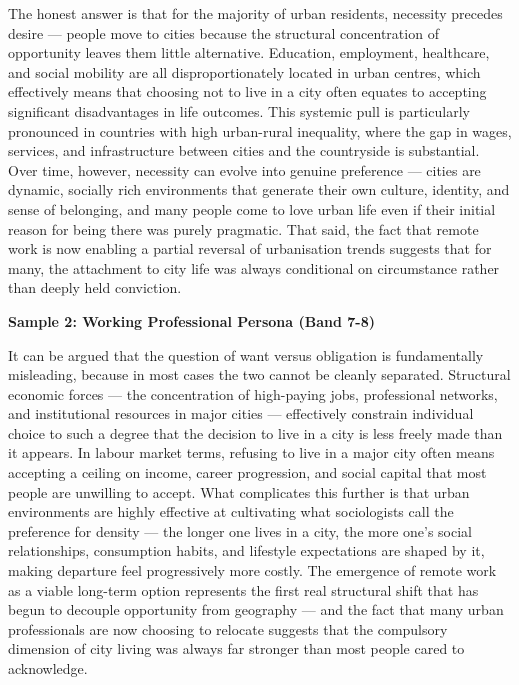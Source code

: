 The honest answer is that for the majority of urban residents, necessity precedes desire — people move to cities because the structural concentration of opportunity leaves them little alternative. Education, employment, healthcare, and social mobility are all disproportionately located in urban centres, which effectively means that choosing not to live in a city often equates to accepting significant disadvantages in life outcomes. This systemic pull is particularly pronounced in countries with high urban-rural inequality, where the gap in wages, services, and infrastructure between cities and the countryside is substantial. Over time, however, necessity can evolve into genuine preference — cities are dynamic, socially rich environments that generate their own culture, identity, and sense of belonging, and many people come to love urban life even if their initial reason for being there was purely pragmatic. That said, the fact that remote work is now enabling a partial reversal of urbanisation trends suggests that for many, the attachment to city life was always conditional on circumstance rather than deeply held conviction.

\textbf{Sample 2: Working Professional Persona (Band 7-8)}

It can be argued that the question of want versus obligation is fundamentally misleading, because in most cases the two cannot be cleanly separated. Structural economic forces — the concentration of high-paying jobs, professional networks, and institutional resources in major cities — effectively constrain individual choice to such a degree that the decision to live in a city is less freely made than it appears. In labour market terms, refusing to live in a major city often means accepting a ceiling on income, career progression, and social capital that most people are unwilling to accept. What complicates this further is that urban environments are highly effective at cultivating what sociologists call the preference for density — the longer one lives in a city, the more one's social relationships, consumption habits, and lifestyle expectations are shaped by it, making departure feel progressively more costly. The emergence of remote work as a viable long-term option represents the first real structural shift that has begun to decouple opportunity from geography — and the fact that many urban professionals are now choosing to relocate suggests that the compulsory dimension of city living was always far stronger than most people cared to acknowledge.

\separator


